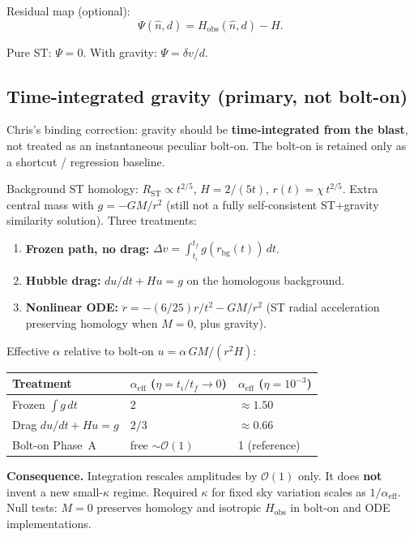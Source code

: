 \documentclass[11pt,a4paper]{article}
\begin{document}
Residual map (optional):
\begin{equation}
\Psi(\hat{n},d)=H_{\mathrm{obs}}(\hat{n},d)-H. \tag{3.15}\label{eq:3.15}
\end{equation}

Pure ST: \(\Psi=0\). With gravity: \(\Psi=\delta v/d\).

\subsection{Time-integrated gravity (primary, not bolt-on)}
\label{sec:timeint}

Chris's binding correction: gravity should be \textbf{time-integrated from the blast}, not treated as an instantaneous peculiar bolt-on. The bolt-on is retained only as a shortcut / regression baseline.

Background ST homology: \(R_{\mathrm{ST}}\propto t^{2/5}\), \(H=2/(5t)\), \(r(t)=\chi\,t^{2/5}\). Extra central mass with \(g=-GM/r^2\) (still not a fully self-consistent ST+gravity similarity solution). Three treatments:
\begin{enumerate}
\item \textbf{Frozen path, no drag:} \(\Delta v=\int_{t_i}^{t_f} g(r_{\mathrm{bg}}(t))\,dt\).
\item \textbf{Hubble drag:} \(du/dt+Hu=g\) on the homologous background.
\item \textbf{Nonlinear ODE:} \(\ddot{r}=-(6/25)r/t^2-GM/r^2\) (ST radial acceleration preserving homology when \(M=0\), plus gravity).
\end{enumerate}

Effective \(\alpha\) relative to bolt-on \(u=\alpha\,GM/(r^2 H)\):

\begin{table}[ht]
\centering
\begin{tabular}{@{}lll@{}}
\toprule
Treatment & \(\alpha_{\mathrm{eff}}\) (\(\eta=t_i/t_f\to 0\)) & \(\alpha_{\mathrm{eff}}\) (\(\eta=10^{-3}\)) \\
\midrule
Frozen \(\int g\,dt\) & 2 & \(\approx 1.50\) \\
Drag \(du/dt+Hu=g\) & \(2/3\) & \(\approx 0.66\) \\
Bolt-on Phase~A & free \(\sim\mathcal{O}(1)\) & 1 (reference) \\
\bottomrule
\end{tabular}
\end{table}

\textbf{Consequence.} Integration rescales amplitudes by \(\mathcal{O}(1)\) only. It does \textbf{not} invent a new small-\(\kappa\) regime. Required \(\kappa\) for fixed sky variation scales as \(1/\alpha_{\mathrm{eff}}\). Null tests: \(M=0\) preserves homology and isotropic \(H_{\mathrm{obs}}\) in bolt-on and ODE implementations.
\end{document}
